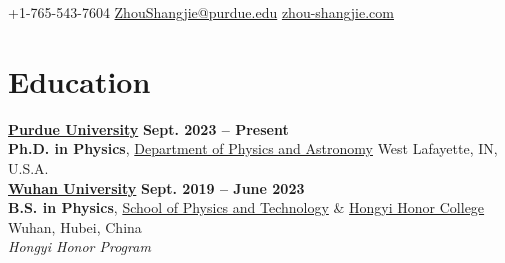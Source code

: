 \documentclass{resume}
\begin{document}
\begin{center}
    \contact
    {\normalsize +1-765-543-7604}
    {\normalsize\href{mailto:ZhouShangjie@purdue.edu}{ZhouShangjie@purdue.edu}}
    {\normalsize\href{https://zhou-shangjie.com/}{zhou-shangjie.com}}
\end{center}

\section{Education}
\begin{content}

    {\href{https://www.purdue.edu}{\bf Purdue University}} \hfill {\bf Sept. 2023 -- Present} \\
    {\bf Ph.D. in Physics}, \href{https://www.physics.purdue.edu}{Department of Physics and Astronomy} \hfill West Lafayette, IN, U.S.A.\\

    {\href{https://www.whu.edu.cn}{\bf Wuhan University}} \hfill {\bf Sept. 2019 -- June 2023} \\
    {\bf B.S. in Physics}, \href{https://physics.whu.edu.cn}{School of Physics and Technology} \& \href{https://hyxt.whu.edu.cn}{Hongyi Honor College} \hfill Wuhan, Hubei, China\\
    {\em Hongyi Honor Program}

    \sectionlineskip
\end{content}

\end{document}
